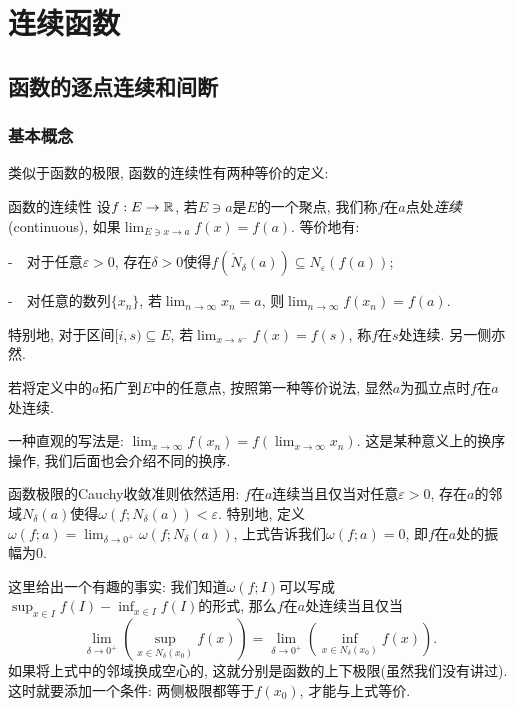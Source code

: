 \chapter{连续函数}

\section{函数的逐点连续和间断}

\subsection{基本概念}

类似于函数的极限, 函数的连续性有两种等价的定义: 

\begin{definition}{函数的连续性}
	设$f:E \to \mathbb{R}$, 若$E \ni a$是$E$的一个聚点, 我们称$f$在$a$点处\textit{连续}(continuous), 如果$\lim_{E \ni x \to a} f(x) = f(a)$. 等价地有: 
	
	-~~对于任意$\varepsilon >0$, 存在$\delta >0$使得$f(\mathring{N}_{\delta} (a)) \subseteq N_{\varepsilon} (f(a))$; 
	
	-~~对任意的数列$\{ x_n \}$, 若$\lim_{n \to \infty} x_n = a$, 则$\lim_{n \to \infty} f(x_n) = f(a)$. 
	
	\noindent
	特别地, 对于区间$[i,s) \subseteq E$, 若$\lim_{x \to s^-} f(x) = f(s)$, 称$f$在$s$处连续. 另一侧亦然. 
\end{definition}
\begin{remark}
	若将定义中的$a$拓广到$E$中的任意点, 按照第一种等价说法, 显然$a$为孤立点时$f$在$a$处连续. 
\end{remark}
\begin{remark}
	一种直观的写法是: $\lim_{x \to \infty} f(x_n) = f(\lim_{x \to \infty}x_n)$. 这是某种意义上的换序操作, 我们后面也会介绍不同的换序. 
\end{remark}

函数极限的Cauchy收敛准则依然适用: $f$在$a$连续当且仅当对任意$\varepsilon >0$, 存在$a$的邻域$N_{\delta} (a)$使得$\omega (f;N_{\delta} (a))<\varepsilon$. 特别地, 定义$\omega (f;a)= \lim_{\delta \to 0^+} \omega (f;N_{\delta} (a))$, 上式告诉我们$\omega (f;a)=0$, 即$f$在$a$处的振幅为$0$. 

这里给出一个有趣的事实: 我们知道$\omega (f;I)$可以写成$\sup_{x \in I} f(I) - \inf_{x \in I} f(I)$的形式, 那么$f$在$a$处连续当且仅当$$\lim_{\delta \to 0^+} \left( \sup_{x \in N_{\delta}(x_0)} f(x) \right)= \lim_{\delta \to 0^+} \left( \inf_{x \in N_{\delta}(x_0)} f(x) \right).$$
如果将上式中的邻域换成空心的, 这就分别是函数的上下极限(虽然我们没有讲过). 这时就要添加一个条件: 两侧极限都等于$f(x_0)$, 才能与上式等价. 


